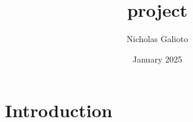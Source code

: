 \documentclass{article}
\title{project}
\author{Nicholas Galioto}
\date{January 2025}
\begin{document}
\maketitle

\section{Introduction}
\end{document}
